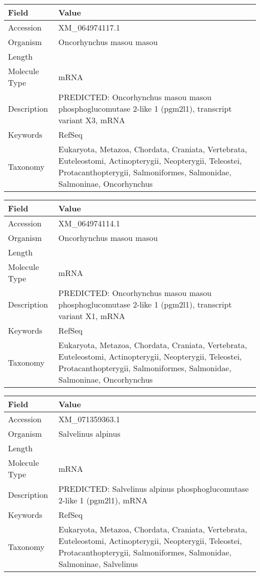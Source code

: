 \documentclass[10pt]{article}
\begin{document}
\vspace{1em}
{\footnotesize
\begin{longtable}{>{\raggedright\arraybackslash}p{4.5cm} >{\raggedright\arraybackslash}p{11.5cm}}
\textbf{Field} & \textbf{Value} \\
\hline
Accession & XM\_064974117.1 \\
Organism & Oncorhynchus masou masou \\
Length & 4123 \\
Molecule Type & mRNA \\
Description & PREDICTED: Oncorhynchus masou masou phosphoglucomutase 2-like 1 (pgm2l1), transcript variant X3, mRNA \\
Keywords & RefSeq \\
Taxonomy & Eukaryota, Metazoa, Chordata, Craniata, Vertebrata, Euteleostomi, Actinopterygii, Neopterygii, Teleostei, Protacanthopterygii, Salmoniformes, Salmonidae, Salmoninae, Oncorhynchus \\
\end{longtable}
}

\vspace{1em}
{\footnotesize
\begin{longtable}{>{\raggedright\arraybackslash}p{4.5cm} >{\raggedright\arraybackslash}p{11.5cm}}
\textbf{Field} & \textbf{Value} \\
\hline
Accession & XM\_064974114.1 \\
Organism & Oncorhynchus masou masou \\
Length & 4647 \\
Molecule Type & mRNA \\
Description & PREDICTED: Oncorhynchus masou masou phosphoglucomutase 2-like 1 (pgm2l1), transcript variant X1, mRNA \\
Keywords & RefSeq \\
Taxonomy & Eukaryota, Metazoa, Chordata, Craniata, Vertebrata, Euteleostomi, Actinopterygii, Neopterygii, Teleostei, Protacanthopterygii, Salmoniformes, Salmonidae, Salmoninae, Oncorhynchus \\
\end{longtable}
}

\vspace{1em}
{\footnotesize
\begin{longtable}{>{\raggedright\arraybackslash}p{4.5cm} >{\raggedright\arraybackslash}p{11.5cm}}
\textbf{Field} & \textbf{Value} \\
\hline
Accession & XM\_071359363.1 \\
Organism & Salvelinus alpinus \\
Length & 4525 \\
Molecule Type & mRNA \\
Description & PREDICTED: Salvelinus alpinus phosphoglucomutase 2-like 1 (pgm2l1), mRNA \\
Keywords & RefSeq \\
Taxonomy & Eukaryota, Metazoa, Chordata, Craniata, Vertebrata, Euteleostomi, Actinopterygii, Neopterygii, Teleostei, Protacanthopterygii, Salmoniformes, Salmonidae, Salmoninae, Salvelinus \\
\end{longtable}
}
\end{document}
